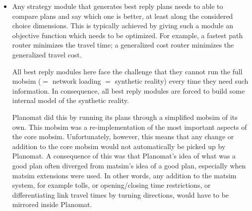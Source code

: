 \begin{itemize}

\item Any strategy module that generates best reply plans needs to able to compare plans and say which one is better, at least along the considered choice dimensions.  This is typically achieved by giving such a module an objective function which needs to be optimized.  For example, a fastest path router minimizes the travel time; a generalized cost router minimizes the generalized travel cost.

All best reply modules here face the challenge that they cannot run the full \gls{mobsim} ($=$ network loading $=$ synthetic reality) every time they need such information.  In consequence, all best reply modules are forced to build some internal model of the synthetic reality.  

Planomat did this by running its plans through a simplified \gls{mobsim} of its own. This \gls{mobsim} was a re-implementation of the most important aspects of the core \gls{mobsim}.
%
%
Unfortunately, however, this means that any change or addition to the core \gls{mobsim} would not automatically be picked up by Planomat.
%
A consequence of this was that Planomat's idea of what was a good plan often diverged from \gls{matsim}'s idea of a good plan, especially when \gls{matsim} extensions were used.
%
In other words, any addition to the \gls{matsim} system, for example tolls, or opening/closing time restrictions, or differentiating link travel times by turning directions, would have to be mirrored inside Planomat.
%


\end{itemize}
